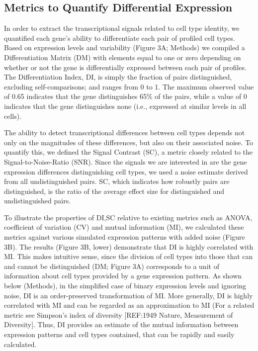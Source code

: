 \subsection{Metrics to Quantify Differential Expression}
In order to extract the transcriptional signals related to cell type identity, we quantified each gene's ability to differentiate each pair of profiled cell types. Based on expression levels and variability (Figure 3A; Methods) we compiled a Differentiation Matrix (DM) with elements equal to one or zero depending on whether or not the gene is differentially expressed between each pair of profiles. The Differentiation Index, DI, is simply the fraction of pairs distinguished, excluding self-comparisons; and ranges from 0 to 1. The maximum observed value of 0.65 indicates that the gene distinguishes 65\% of the pairs, while a value of 0 indicates that the gene distinguishes none (i.e., expressed at similar levels in all cells). 

The ability to detect transcriptional differences between cell types depends not only on the magnitudes of these differences, but also on their associated noise. To quantify this, we defined the Signal Contrast (SC), a metric closely related to the Signal-to-Noise-Ratio (SNR). Since the signals we are interested in are the gene expression differences distinguishing cell types, we used a noise estimate derived from all undistinguished pairs. SC, which indicates how robustly pairs are distinguished, is the ratio of the average effect size for distinguished and undistinguished pairs. 

To illustrate the properties of DI,SC relative to existing metrics such as ANOVA, coefficient of variation (CV) and mutual information (MI), we calculated these metrics against various simulated expression patterns with added noise (Figure 3B). The results (Figure 3B, lower) demonstrate that DI is highly correlated with MI. This makes intuitive sense, since the division of cell types into those that can and cannot be distinguished (DM; Figure 3A) corresponds to a unit of information about cell types provided by a gene expression pattern. As shown below (Methods), in the simplified case of binary expression levels and ignoring noise, DI is an order-preserved transformation of MI. More generally, DI is highly correlated with MI and can be regarded as an approximation to MI (For a related metric see Simpson's index of diversity [REF:1949 Nature, Measurement of Diversity]. Thus, DI provides an estimate of the mutual information between expression patterns and cell types contained, that can be rapidly and easily calculated. 

